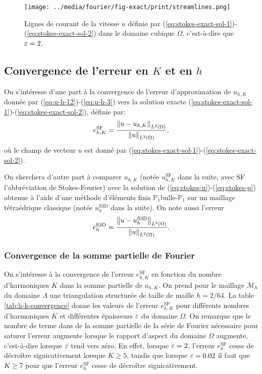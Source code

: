 \begin{figure}[t]
  \begin{center}
    \texttt{[image: ../media/fourier/fig-exact/print/streamlines.png]}
    \caption{Lignes de courant de la vitesse $u$ définie par
      (\ref{eq:stokes-exact-sol-1})-(\ref{eq:stokes-exact-sol-2}) dans
      le domaine cubique $\Omega$, c'est-à-dire que $\varepsilon = 2$.}
    \label{fig:stokes-exact-sol-streamlines}
  \end{center}
\end{figure}
\clearpage

\subsection{Convergence de l'erreur en $K$ et en $h$}
On s'intéresse d'une part à la convergence de l'erreur d'approximation
de $u_{h,K}$ donnée par (\ref{eq:u-h-12})-(\ref{eq:u-h-3}) vers la
solution exacte
(\ref{eq:stokes-exact-sol-1})-(\ref{eq:stokes-exact-sol-2}), définie
par:
\begin{equation}
  e_{h,K}^{\mathrm{SF}} =
  \frac{\left\lVert u - u_{h,K} \right\rVert_{L^2(\Omega)}}{\left\lVert u \right\rVert_{L^2(\Omega)}},
\end{equation}
où le champ de vecteur $u$ est donné par
(\ref{eq:stokes-exact-sol-1})-(\ref{eq:stokes-exact-sol-2}).

On cherchera d'autre part à comparer $u_{h,K}$ (notée
$u_{h,K}^{\mathrm{SF}}$ dans la suite, avec SF l'abbréviation de
Stokes-Fourier) avec la solution de
(\ref{eq:stokes-u})-(\ref{eq:stokes-p}) obtenue à l'aide d'une méthode
d'éléments finis $\mathbb P_1$bulle-$\mathbb P_1$ sur un maillage
tétraédrique classique (notée $u_h^\mathrm{S3D}$ dans la suite). On
note aussi l'erreur
\begin{equation}
  e_h^{\mathrm{S3D}} = \frac{\left\lVert u - u_h^{\mathrm{S3D}} \right\rVert_{L^2(\Omega)}}{\left\lVert u \right\rVert_{L^2(\Omega)}}.
\end{equation}

\subsubsection{Convergence de la somme partielle de Fourier}
On s'intéresse à la convergence de l'erreur $e_{h,K}^\mathrm{SF}$ en
fonction du nombre d'harmoniques $K$ dans la somme partielle de
$u_{h,K}$. On prend pour le maillage $\mathcal M_h$ du domaine $\Lambda$
une triangulation structurée de taille de maille $h = 2/64$. La
table \ref{tab:h-k-convergence} donne les valeurs de l'erreur
$e_{h,K}^\mathrm{SF}$ pour différents nombres d'harmoniques $K$ et
différentes épaisseurs $\varepsilon$ du domaine $\Omega$. On remarque
que le nombre de terme dans de la somme partielle de la série de
Fourier nécessaire pour saturer l'erreur augmente lorsque le rapport
d'aspect du domaine $\Omega$ augmente, c'est-à-dire lorsque
$\varepsilon$ tend vers zéro. En effet, lorsque $\varepsilon = 2$,
l'erreur $e_h^\mathrm{SF}$ cesse de décroître signicativement lorsque $K \geq 5$,
tandis que lorsque $\varepsilon = 0.02$ il faut que $K \geq 7$ pour que
l'erreur $e_h^\mathrm{SF}$ cesse de décroître signicativement.

